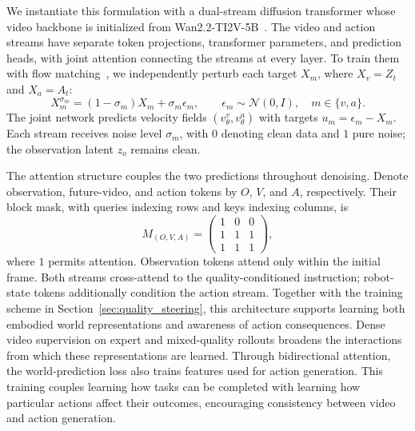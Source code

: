 We instantiate this formulation with a dual-stream diffusion transformer whose video backbone is initialized from Wan2.2-TI2V-5B~\citep{wan2025}.
The video and action streams have separate token projections, transformer parameters, and prediction heads, with joint attention connecting the streams at every layer.
To train them with flow matching~\citep{lipman2023flow}, we independently perturb each target $X_m$, where $X_v=Z_t$ and $X_a=A_t$:
\begin{equation}
    X_m^{\sigma_m}=(1-\sigma_m)X_m+\sigma_m\epsilon_m,
    \qquad \epsilon_m\sim\mathcal N(0,I),\quad m\in\{v,a\}.
    \label{eq:flow_path}
\end{equation}
The joint network predicts velocity fields $(v_\theta^v,v_\theta^a)$ with targets $u_m=\epsilon_m-X_m$.
Each stream receives noise level $\sigma_m$, with $0$ denoting clean data and $1$ pure noise; the observation latent $z_o$ remains clean.

The attention structure couples the two predictions throughout denoising.
Denote observation, future-video, and action tokens by $O$, $V$, and $A$, respectively.
Their block mask, with queries indexing rows and keys indexing columns, is
\begin{equation}
    M_{(O,V,A)}=
    \begin{pmatrix}
        1 & 0 & 0\\
        1 & 1 & 1\\
        1 & 1 & 1
    \end{pmatrix},
    \label{eq:joint_mask}
\end{equation}
where $1$ permits attention.
Observation tokens attend only within the initial frame.
Both streams cross-attend to the quality-conditioned instruction; robot-state tokens additionally condition the action stream.
Together with the training scheme in Section~\ref{sec:quality_steering}, this architecture supports learning both embodied world representations and awareness of action consequences.
Dense video supervision on expert and mixed-quality rollouts broadens the interactions from which these representations are learned.
Through bidirectional attention, the world-prediction loss also trains features used for action generation.
This training couples learning how tasks can be completed with learning how particular actions affect their outcomes, encouraging consistency between video and action generation.

